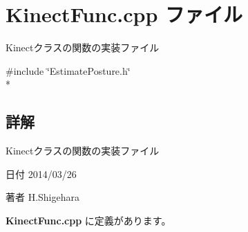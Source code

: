 \section{Kinect\-Func.\-cpp ファイル}
\label{_kinect_func_8cpp}


Kinectクラスの関数の実装ファイル  


{\ttfamily \#include \char`\"{}Estimate\-Posture.\-h\char`\"{}}\\*


\subsection{詳解}
Kinectクラスの関数の実装ファイル \begin{DoxyDate}{日付}
2014/03/26 
\end{DoxyDate}
\begin{DoxyAuthor}{著者}
H.\-Shigehara 
\end{DoxyAuthor}


 {\bf Kinect\-Func.\-cpp} に定義があります。

